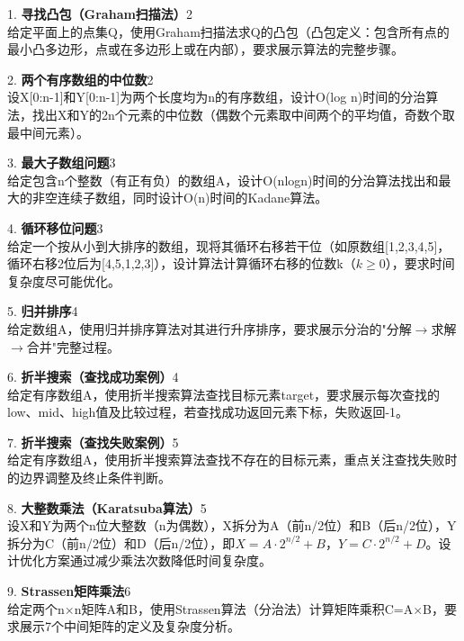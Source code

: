 \vspace{8pt}
1. \textbf{寻找凸包（Graham扫描法）}\hfill 2\\
给定平面上的点集Q，使用Graham扫描法求Q的凸包（凸包定义：包含所有点的最小凸多边形，点或在多边形上或在内部），要求展示算法的完整步骤。

\vspace{8pt}
2. \textbf{两个有序数组的中位数}\hfill 2\\
设X[0:n-1]和Y[0:n-1]为两个长度均为n的有序数组，设计O(log n)时间的分治算法，找出X和Y的2n个元素的中位数（偶数个元素取中间两个的平均值，奇数个取最中间元素）。

\vspace{8pt}
3. \textbf{最大子数组问题}\hfill 3\\
给定包含n个整数（有正有负）的数组A，设计O(nlogn)时间的分治算法找出和最大的非空连续子数组，同时设计O(n)时间的Kadane算法。

\vspace{8pt}
4. \textbf{循环移位问题}\hfill 3\\
给定一个按从小到大排序的数组，现将其循环右移若干位（如原数组[1,2,3,4,5]，循环右移2位后为[4,5,1,2,3]），设计算法计算循环右移的位数k（$k \ge 0$），要求时间复杂度尽可能优化。

\vspace{8pt}
5. \textbf{归并排序}\hfill 4\\
给定数组A，使用归并排序算法对其进行升序排序，要求展示分治的"分解$\to$求解$\to$合并"完整过程。

\vspace{8pt}
6. \textbf{折半搜索（查找成功案例）}\hfill 4\\
给定有序数组A，使用折半搜索算法查找目标元素target，要求展示每次查找的low、mid、high值及比较过程，若查找成功返回元素下标，失败返回-1。

\vspace{8pt}
7. \textbf{折半搜索（查找失败案例）}\hfill 5\\
给定有序数组A，使用折半搜索算法查找不存在的目标元素，重点关注查找失败时的边界调整及终止条件判断。

\vspace{8pt}
8. \textbf{大整数乘法（Karatsuba算法）}\hfill 5\\
设X和Y为两个n位大整数（n为偶数），X拆分为A（前n/2位）和B（后n/2位），Y拆分为C（前n/2位）和D（后n/2位），即$X=A \cdot 2^{n/2}+B$，$Y=C \cdot 2^{n/2}+D$。设计优化方案通过减少乘法次数降低时间复杂度。

\vspace{8pt}
9. \textbf{Strassen矩阵乘法}\hfill 6\\
给定两个n$\times$n矩阵A和B，使用Strassen算法（分治法）计算矩阵乘积C=A$\times$B，要求展示7个中间矩阵的定义及复杂度分析。

